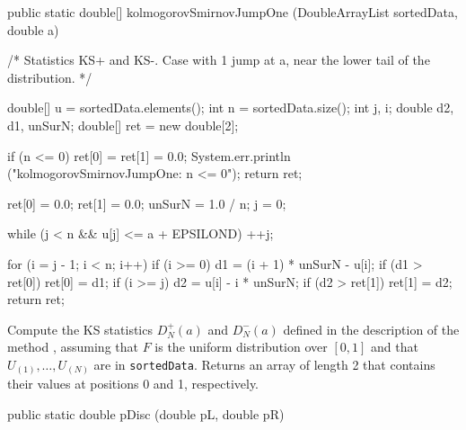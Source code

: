 \begin{code}

   public static double[] kolmogorovSmirnovJumpOne (DoubleArrayList sortedData,
                                                    double a)\begin{hide} {
      /* Statistics KS+ and KS-. Case with 1 jump at a, near the lower tail of
         the distribution. */

      double[] u = sortedData.elements();
      int n = sortedData.size();
      int j, i;
      double d2, d1, unSurN;
      double[] ret = new double[2];

      if (n <= 0) {
         ret[0] = ret[1] = 0.0;
         System.err.println ("kolmogorovSmirnovJumpOne: n <= 0");
         return ret;
      }

      ret[0] = 0.0;
      ret[1] = 0.0;
      unSurN = 1.0 / n;
      j = 0;

      while (j < n && u[j] <= a + EPSILOND) ++j;

      for (i = j - 1; i < n; i++) {
         if (i >= 0) {
            d1 = (i + 1) * unSurN - u[i];
            if (d1 > ret[0])
               ret[0] = d1;
         }
         if (i >= j) {
            d2 = u[i] - i * unSurN;
            if (d2 > ret[1])
               ret[1] = d2;
         }
      }
      return ret;
   }\end{hide}
\end{code}
\begin{tabb} Compute the KS statistics $D_N^+(a)$ and $D_N^-(a)$ defined in
  the description of the method
  , assuming that $F$ is the
  uniform distribution over $[0,1]$ and that
  $U_{(1)},\dots,U_{(N)}$ are in \texttt{sortedData}.
  Returns an array of length 2 that contains their values at positions
  0 and 1, respectively.
 \end{tabb}
\begin{htmlonly}
\end{htmlonly}
\begin{code}

   public static double pDisc (double pL, double pR)\begin{hide} {
      double p;

      if (pR < pL)
         p = pR;
      else if (pL > 0.5)
         p = 0.5;
      else
         p = 1.0 - pL;
      // Note: si p est tres proche de 1, on perd toute la precision ici!
      // Note2: je ne pense pas que cela puisse se produire a cause des if (RS)
      return p;
   }
}\end{hide}
\end{code}
